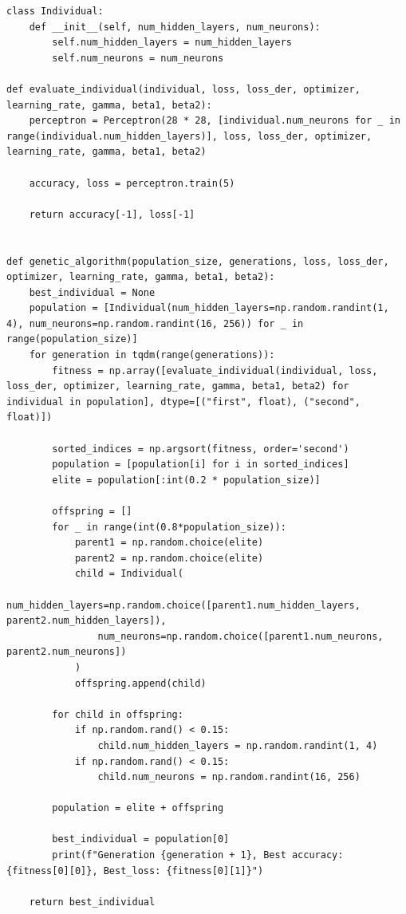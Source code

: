 \documentclass[a4paper, 14pt]{extarticle}
\begin{document}
\begin{lstlisting}[language={},caption={Генетический алгоритм},label={lst:code7}]
class Individual:
    def __init__(self, num_hidden_layers, num_neurons):
        self.num_hidden_layers = num_hidden_layers
        self.num_neurons = num_neurons

def evaluate_individual(individual, loss, loss_der, optimizer, learning_rate, gamma, beta1, beta2):
    perceptron = Perceptron(28 * 28, [individual.num_neurons for _ in range(individual.num_hidden_layers)], loss, loss_der, optimizer, learning_rate, gamma, beta1, beta2)

    accuracy, loss = perceptron.train(5)

    return accuracy[-1], loss[-1]


def genetic_algorithm(population_size, generations, loss, loss_der, optimizer, learning_rate, gamma, beta1, beta2):
    best_individual = None
    population = [Individual(num_hidden_layers=np.random.randint(1, 4), num_neurons=np.random.randint(16, 256)) for _ in range(population_size)]
    for generation in tqdm(range(generations)):
        fitness = np.array([evaluate_individual(individual, loss, loss_der, optimizer, learning_rate, gamma, beta1, beta2) for individual in population], dtype=[("first", float), ("second", float)])

        sorted_indices = np.argsort(fitness, order='second')
        population = [population[i] for i in sorted_indices]
        elite = population[:int(0.2 * population_size)]

        offspring = []
        for _ in range(int(0.8*population_size)):
            parent1 = np.random.choice(elite)
            parent2 = np.random.choice(elite)
            child = Individual(
                num_hidden_layers=np.random.choice([parent1.num_hidden_layers, parent2.num_hidden_layers]),
                num_neurons=np.random.choice([parent1.num_neurons, parent2.num_neurons])
            )
            offspring.append(child)

        for child in offspring:
            if np.random.rand() < 0.15:
                child.num_hidden_layers = np.random.randint(1, 4)
            if np.random.rand() < 0.15:
                child.num_neurons = np.random.randint(16, 256)

        population = elite + offspring

        best_individual = population[0]
        print(f"Generation {generation + 1}, Best accuracy: {fitness[0][0]}, Best_loss: {fitness[0][1]}")

    return best_individual

\end{lstlisting}
\end{document}
